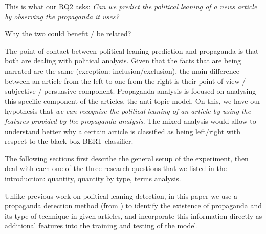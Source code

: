 This is what our RQ2 asks: \emph{Can we predict the political leaning of a news article by observing the propaganda it uses?}

Why the two could benefit / be related?

The point of contact between political leaning prediction and propaganda is that both are dealing with political analysis.
Given that the facts that are being narrated are the same (exception: inclusion/exclusion), the main difference between an article from the left to one from the right is their point of view / subjective / persuasive component. Propaganda analysis is focused on analysing this specific component of the articles, the anti-topic model.
On this, we have our hypothesis that \emph{we can recognise the political leaning of an article by using the features provided by the propaganda analysis}.
The mixed analysis would allow to understand better why a certain article is classified as being left/right with respect to the black box BERT classifier.

The following sections first describe the general setup of the experiment, then deal with each one of the three research questions that we listed in the introduction: quantity, quantity by type, terms analysis.%


Unlike previous work on political leaning detection, in this paper we use a propaganda detection method (from \citet{da2019fine}) to identify the existence of propaganda and its type of technique in given articles, and incorporate this information directly as additional features into the training and testing of the model.  


